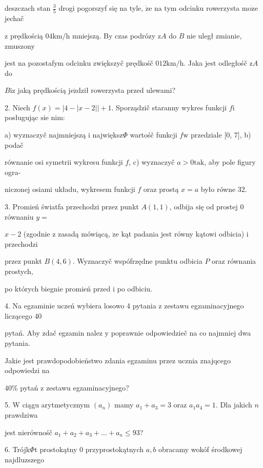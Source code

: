 \documentclass[a4paper,12pt]{article}
\begin{document}
deszczach stan $\displaystyle \frac{3}{5}$ drogi pogorszyf się na tyle, $\dot{\mathrm{z}}\mathrm{e}$ na tym odcinku rowerzysta $\mathrm{m}\mathrm{o}\dot{\mathrm{z}}\mathrm{e}$ jechač

$\mathrm{z}$ prędkością $04\mathrm{k}\mathrm{m}/\mathrm{h}$ mniejszą. By czas podrózy $\mathrm{z}A$ do $B$ nie uległ zmianie, zmuszony

jest na pozostafym odcinku zwiększyč prędkośč $012\mathrm{k}\mathrm{m}/\mathrm{h}$. Jaka jest odległośč $\mathrm{z}A$ do

$B\mathrm{i}\mathrm{z}$ jaką prędkością $\mathrm{j}\mathrm{e}\acute{\mathrm{z}}$dził rowerzysta przed ulewami?

2. Niech $f(x)=|4-|x-2||+1$. Sporządzič staranny wykres funkcji $f\mathrm{i}$ posługując $\mathrm{s}\mathrm{i}\mathrm{e}$ nim:

a) wyznaczyč najmniejszą $\mathrm{i}$ największ$\Phi$ wartośč funkcji $f\mathrm{w}$ przedziale $[0$, 7$]$, b) podač

równanie osi symetrii wykresu funkcji $f$, c) wyznaczyč $a>0\mathrm{t}\mathrm{a}\mathrm{k}$, aby pole figury ogra-

niczonej osiami układu, wykresem funkcji $f$ oraz prostą $x=a$ było równe 32.

3. Promień światfa przechodzi przez punkt $A(1,1)$, odbija się od prostej $0$ równaniu $y=$

$x-2$ (zgodnie $\mathrm{z}$ zasadą mówiącą, $\dot{\mathrm{z}}\mathrm{e}$ kąt padania jest równy kątowi odbicia) $\mathrm{i}$ przechodzi

przez punkt $B(4,6)$. Wyznaczyč wspófrzędne punktu odbicia $P$ oraz równania prostych,

po których biegnie promień przed $\mathrm{i}$ po odbiciu.

4. Na egzaminie uczeń wybiera losowo 4 pytania $\mathrm{z}$ zestawu egzaminacyjnego liczącego 40

pytań. Aby zdač egzamin nalez $\mathrm{y}$ poprawnie odpowiedzieč na co najmniej dwa pytania.

Jakie jest prawdopodobieństwo zdania egzaminu przez ucznia znajqcego odpowiedzi na

40\% pytań $\mathrm{z}$ zestawu egzaminacyjnego?

5. $\mathrm{W}$ ciągu arytmetycznym $(a_{n})$ mamy $a_{1}+a_{3}=3$ oraz $a_{1}a_{4}=1$. Dla jakich $n$ prawdziwa

jest nierównośč $a_{1}+a_{2}+a_{3}+\ldots+a_{n}\leq 93$?

6. Trójk$\Phi$t prostokątny $0$ przyprostokątnych $a, b$ obracamy wokóf środkowej najdluzszego
\end{document}
